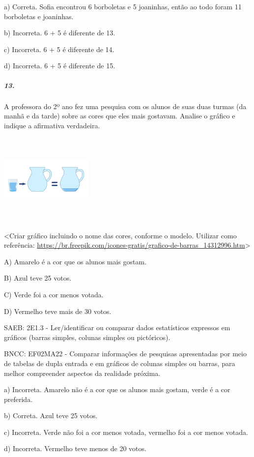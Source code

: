 a) Correta. Sofia encontrou 6 borboletas e 5 joaninhas, então ao todo
foram 11 borboletas e joaninhas.

b) Incorreta. 6 + 5 é diferente de 13.

c) Incorreta. 6 + 5 é diferente de 14.

d) Incorreta. 6 + 5 é diferente de 15.

\subparagraph{13. }\label{section-127}

A professora do 2º ano fez uma pesquisa com os alunos de suas duas
turmas (da manhã e da tarde) sobre as cores que eles mais gostavam.
Analise o gráfico e indique a afirmativa verdadeira.

\includegraphics[width=1.78819in,height=1.78819in]{media/image140.png}

\textless{}Criar gráfico incluindo o nome das cores, conforme o modelo.
Utilizar como referência:
\url{https://br.freepik.com/icones-gratis/grafico-de-barras_14312996.htm}\textgreater{}

A) Amarelo é a cor que os alunos mais gostam.

B) Azul teve 25 votos.

C) Verde foi a cor menos votada.

D) Vermelho teve mais de 30 votos.

SAEB: 2E1.3 - Ler/identificar ou comparar dados estatísticos expressos
em gráficos (barras simples, colunas simples ou pictóricos).

BNCC: EF02MA22 - Comparar informações de pesquisas apresentadas por meio
de tabelas de dupla entrada e em gráficos de colunas simples ou barras,
para melhor compreender aspectos da realidade próxima.

a) Incorreta. Amarelo não é a cor que os alunos mais gostam, verde é a
cor preferida.

b) Correta. Azul teve 25 votos.

c) Incorreta. Verde não foi a cor menos votada, vermelho foi a cor menos
votada.

d) Incorreta. Vermelho teve menos de 20 votos.


